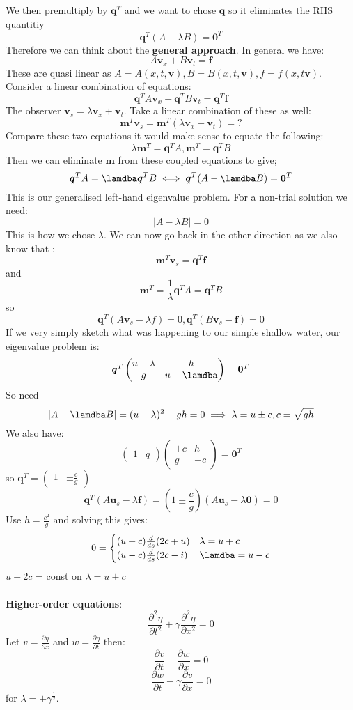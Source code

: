 \documentclass{article}
\begin{document}
 We then premultiply by $\bm q^T$ and we want to chose $\bm q$ so it eliminates the RHS quantitiy
 $$
  \bm q^T ( A - \lambda B) = \bm 0^T
 $$
 Therefore we can think about the \textbf{general approach}. In general we have:
 $$
 A \bm v_x + B \bm v_t = \bm f
 $$
 These are quasi linear as $A = A(x,t, \bm v), B = B( x,t, \bm v), f = f(x,t \bm v)$. Consider a linear combination of equations:
 $$
  \bm q^T A \bm v_x + \bm q^T B \bm v_t = \bm q^T \bm f
 $$
 The observer $\bm v_s = \lambda \bm v_x + \bm v_t$. Take a linear combination of these as well:
 $$
 \bm m^T \bm v_s = \bm m^T ( \lambda \bm v_x + \bm v_t) = ?
 $$
 Compare these two equations it would make sense to equate the following:
 $$
\lambda \bm m^T = \bm q^T A, \bm m^T = \bm q^T B
 $$
 Then we can eliminate $\bm m$ from these coupled equations to give;
 $$
  \bm q^T A = \lamdba \bm q^T B \iff \bm q^T ( A - \lamdba B) = \bm 0^T
 $$
 This is our generalised left-hand eigenvalue problem. For a non-trial solution we need:
 $$
  |A- \lambda B| = 0
 $$
This is how we chose $\lambda$. We can now go back in the other direction as we also know that :
$$
 \bm  m^T \bm v_s = \bm q^T \bm f
$$
and
$$
 \bm m^T = \frac{1}{\lambda} \bm q^T A = \bm q^T B
$$
so
$$
 \bm q^T( A \bm v_s - \lambda f) = 0, \bm q^T ( B \bm v_s - \bm f) = 0
$$
If we very simply sketch what was happening to our simple shallow water, our eigenvalue problem is:
$$
 \bm q^T \begin{pmatrix} u-\lambda & h \\ g & u - \lamdba \end{pmatrix} = \bm 0^T
$$
 So need
 $$
  | A - \lamdba B| = ( u- \lambda)^2 - g h = 0 \implies \lambda = u \pm c, c = \sqrt{gh}
 $$
 We also have:
 $$
  \begin{pmatrix} 1 & q \end{pmatrix} \begin{pmatrix} \pm c & h \\ g & \pm c \end{pmatrix} = \bm 0 ^T
 $$
  so $\bm q^T = \begin{pmatrix} 1 & \pm \frac{c}{g} \end{pmatrix}$
  $$
   \bm q^T ( A\bm u_s - \lambda \bm f) = ( 1 \pm \frac{c}{g}) ( A \bm u_s - \lambda \bm 0) = 0
  $$
  Use $h = \frac{c^2}{g}$ and solving this gives:
  $$
   0= \begin{cases} (u +c ) \frac{d}{ds} ( 2c + u) & \lambda = u + c\\
   (u-c) \frac{d}{ds} ( 2  c- i) & \lamdba = u -c\end{cases}
  $$
  $u \pm 2c$ = const on $\lambda = u \pm c$\\\\
  \textbf{Higher-order equations}:
  $$
  \frac{\partial^2 \eta}{\partial t^2} + \gamma \frac{\partial^2 \eta}{\partial x^2} = 0
  $$
  Let $v = \frac{\partial \eta}{\partial x}$ and $w = \frac{\partial \eta}{\partial t}$ then:
  $$
   \frac{\partial v}{\partial t} - \frac{\partial w}{\partial x} = 0
  $$
  $$
   \frac{\partial w}{\partial t} - \gamma \frac{\partial v}{\partial x} = 0
  $$
  for $\lambda = \pm \gamma^{\frac{1}{2}}$.
\end{document}
